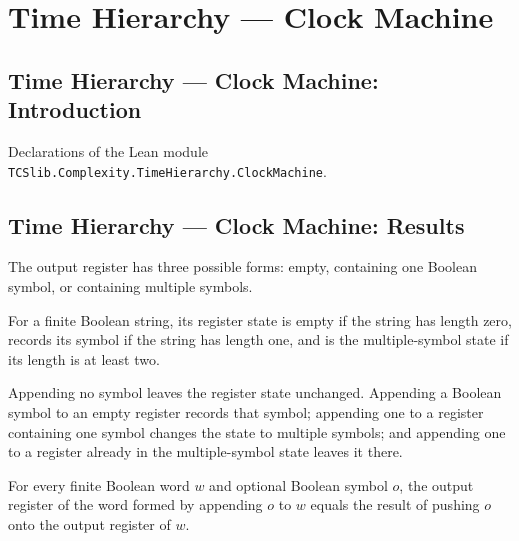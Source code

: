 \section{Time Hierarchy --- Clock Machine}
\subsection*{Time Hierarchy --- Clock Machine: Introduction}

Declarations of the Lean module \texttt{TCSlib.Complexity.TimeHierarchy.ClockMachine}.

\subsection*{Time Hierarchy --- Clock Machine: Results}

\begin{definition}
\label{Complexity.TimeHierarchy.OutReg}
\leanok
The output register has three possible forms: empty, containing one Boolean symbol, or
containing multiple symbols.
\end{definition}

\begin{definition}
\label{Complexity.TimeHierarchy.OutReg.ofList}
\leanok
{}
For a finite Boolean string, its register state is empty if the string has length zero,
records its symbol if the string has length one, and is the multiple-symbol state if its
length is at least two.
\end{definition}

\begin{definition}
\label{Complexity.TimeHierarchy.OutReg.push}
\leanok
{}
Appending no symbol leaves the register state unchanged. Appending a Boolean symbol to
an empty register records that symbol; appending one to a register containing one symbol
changes the state to multiple symbols; and appending one to a register already in the
multiple-symbol state leaves it there.
\end{definition}

\begin{lemma}
\label{Complexity.TimeHierarchy.OutReg.ofList_push}
\leanok
{}
For every finite Boolean word $w$ and optional Boolean symbol $o$, the output register
of the word formed by appending $o$ to $w$ equals the result of pushing $o$ onto the
output register of $w$.
\end{lemma}

